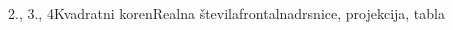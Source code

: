 \begin{priprava}{2., 3., 4}{}{Kvadratni koren}{Realna števila}{frontalna}{drsnice, projekcija, tabla}
\begin{multicols}{2}
            ~~~~~~~~~~~~\\
            
        \end{multicols}

    
\end{priprava}